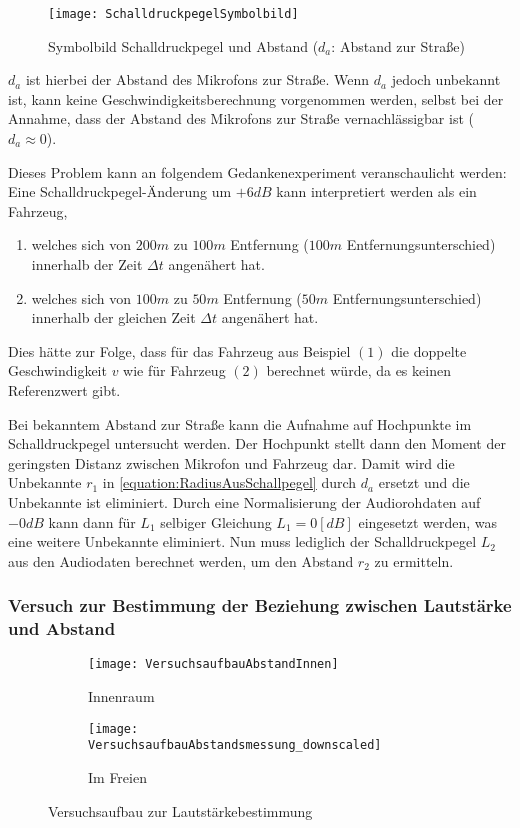 \begin{figure}[h]
    \centering
    \texttt{[image: SchalldruckpegelSymbolbild]}
    \caption{Symbolbild Schalldruckpegel und Abstand (\(d_{a}\): Abstand zur Straße)}
    \label{img:SchalldruckpegelSymbolbild}
\end{figure}

\(d_{a}\) ist hierbei der Abstand des Mikrofons zur Straße. Wenn \(d_{a}\) jedoch unbekannt ist, kann keine Geschwindigkeitsberechnung vorgenommen werden, selbst bei der Annahme, dass der Abstand des Mikrofons zur Straße vernachlässigbar ist (\(d_{a} \approx 0\)).

Dieses Problem kann an folgendem Gedankenexperiment veranschaulicht werden: Eine Schall\-druck\-pegel-Änderung um \(+6 dB\) kann interpretiert werden als ein Fahrzeug,
\begin{enumerate}
    \item welches sich von \(200 m\) zu \(100 m\) Entfernung (\(100 m\) Entfernungsunterschied) innerhalb der Zeit \(\Delta t\) angenähert hat.
    \item welches sich von \(100 m\) zu \(50 m\) Entfernung (\(50 m\) Entfernungsunterschied) innerhalb der gleichen Zeit \(\Delta t\) angenähert hat.
\end{enumerate}
Dies hätte zur Folge, dass für das Fahrzeug aus Beispiel \((1)\) die doppelte Geschwindigkeit \(v\) wie für Fahrzeug \((2)\) berechnet würde, da es keinen Referenzwert gibt.

Bei bekanntem Abstand zur Straße kann die Aufnahme auf Hochpunkte im Schalldruckpegel untersucht werden. Der Hochpunkt stellt dann den Moment der geringsten Distanz zwischen Mikrofon und Fahrzeug dar. Damit wird die Unbekannte \(r_{1}\) in \autoref{equation:RadiusAusSchallpegel} durch \(d_{a}\) ersetzt und die Unbekannte ist eliminiert. Durch eine Normalisierung der Audiorohdaten auf \(-0 dB\) kann dann für \(L_{1}\) selbiger Gleichung \(L_{1} = 0 [dB]\) eingesetzt werden, was eine weitere Unbekannte eliminiert. Nun muss lediglich der Schalldruckpegel \(L_{2}\) aus den Audiodaten berechnet werden, um den Abstand \(r_{2}\) zu ermitteln.


\subsubsection{Versuch zur Bestimmung der Beziehung zwischen Lautstärke und Abstand}

\begin{figure}[h]
    \begin{subfigure}{.5\textwidth}
        \centering
        \texttt{[image: VersuchsaufbauAbstandInnen]}
        \caption{Innenraum}
        \label{img:dist_room}
    \end{subfigure}
    \begin{subfigure}{.5\textwidth}
        \centering
        \texttt{[image: VersuchsaufbauAbstandsmessung\_downscaled]}
        \caption{Im Freien}
        \label{img:dist_free_field}
    \end{subfigure}
    \caption{Versuchsaufbau zur Lautstärkebestimmung}
    \label{img:versuche_abstand}
\end{figure}

